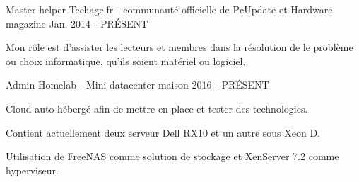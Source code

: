 

\begin{cventries}

  \cventry
    {Master helper} %
    {Techage.fr - communauté officielle de PcUpdate et Hardware magazine} %
    {} %
    {Jan. 2014 - PRÉSENT} %
    {
      \begin{cvitems} %
        \item {Mon rôle est d'assister les lecteurs et membres dans la résolution de le problème ou choix informatique, qu'ils soient matériel ou logiciel.}
      \end{cvitems}
    }

  \cventry
    {Admin} %
    {Homelab - Mini datacenter maison} %
    {} %
    {2016 - PRÉSENT} %
    {
      \begin{cvitems} %
        \item {Cloud auto-hébergé afin de mettre en place et tester des technologies.}
        \item {Contient actuellement deux serveur Dell RX10 et un autre sous Xeon D.}
        \item {Utilisation de FreeNAS comme solution de stockage et XenServer 7.2 comme hyperviseur.}
      \end{cvitems}
    }

\end{cventries}
